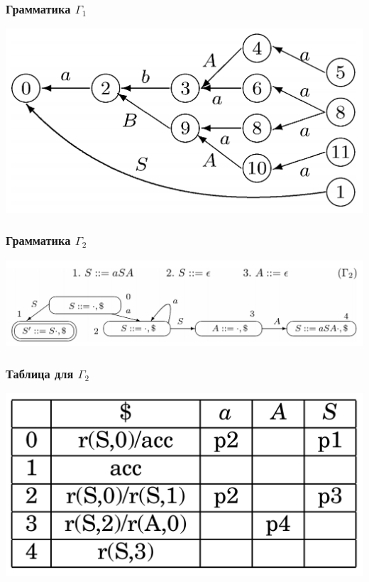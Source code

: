\documentclass{beamer}
\begin{document}
\begin{frame}[fragile]
  \transwipe[direction=90]
  \frametitle{Грамматика $\Gamma_1$}
\begin{center}
  \includegraphics[width=1.0\textwidth]{pics/3}
\end{center}                                      
\end{frame}

\begin{frame}[fragile]
  \transwipe[direction=90]
  \frametitle{Грамматика $\Gamma_2$}
\begin{center}
  \includegraphics[width=1.0\textwidth]{pics/4}
\end{center}                                      
\end{frame}

\begin{frame}[fragile]
  \transwipe[direction=90]
  \frametitle{Таблица для $\Gamma_2$}
\begin{center}
  \includegraphics[width=1.0\textwidth]{pics/5}
\end{center}                                      
\end{frame}
\end{document}
